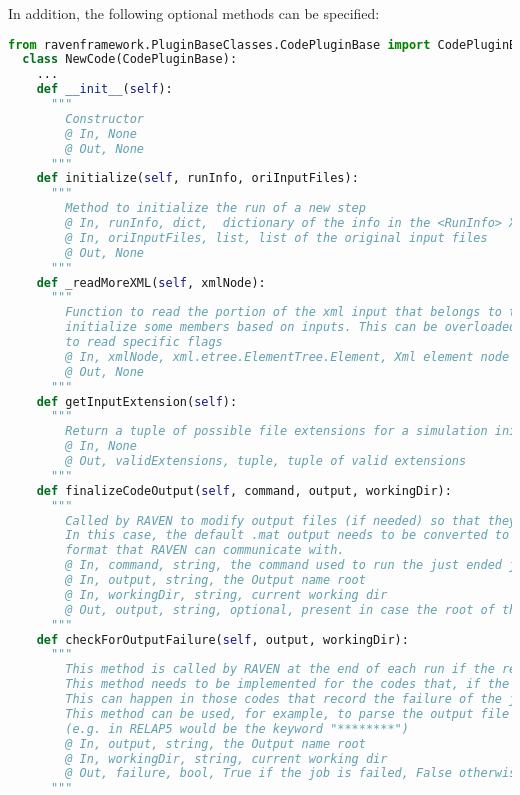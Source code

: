 In addition, the following optional methods can be specified:
\begin{lstlisting}[language=python, basicstyle=\scriptsize\ttfamily, breaklines=True, columns=fullflexible]
  from ravenframework.PluginBaseClasses.CodePluginBase import CodePluginBase
  class NewCode(CodePluginBase):
    ...
    def __init__(self):
      """
        Constructor
        @ In, None
        @ Out, None
      """
    def initialize(self, runInfo, oriInputFiles):
      """
        Method to initialize the run of a new step
        @ In, runInfo, dict,  dictionary of the info in the <RunInfo> XML block
        @ In, oriInputFiles, list, list of the original input files
        @ Out, None
      """
    def _readMoreXML(self, xmlNode):
      """
        Function to read the portion of the xml input that belongs to this specialized class and
        initialize some members based on inputs. This can be overloaded in specialized code interface in order
        to read specific flags
        @ In, xmlNode, xml.etree.ElementTree.Element, Xml element node
        @ Out, None
      """
    def getInputExtension(self):
      """
        Return a tuple of possible file extensions for a simulation initialization file (e.g., input.i).
        @ In, None
        @ Out, validExtensions, tuple, tuple of valid extensions
      """
    def finalizeCodeOutput(self, command, output, workingDir):
      """
        Called by RAVEN to modify output files (if needed) so that they are in a proper form.
        In this case, the default .mat output needs to be converted to .csv output, which is the
        format that RAVEN can communicate with.
        @ In, command, string, the command used to run the just ended job
        @ In, output, string, the Output name root
        @ In, workingDir, string, current working dir
        @ Out, output, string, optional, present in case the root of the output file gets changed in this method.
      """
    def checkForOutputFailure(self, output, workingDir):
      """
        This method is called by RAVEN at the end of each run if the return code is == 0.
        This method needs to be implemented for the codes that, if the run fails, return a return code that is 0
        This can happen in those codes that record the failure of the job (e.g. not converged, etc.) as normal termination (returncode == 0)
        This method can be used, for example, to parse the output file looking for a special keyword that testifies that a particular job got failed
        (e.g. in RELAP5 would be the keyword "********")
        @ In, output, string, the Output name root
        @ In, workingDir, string, current working dir
        @ Out, failure, bool, True if the job is failed, False otherwise
      """
\end{lstlisting}

